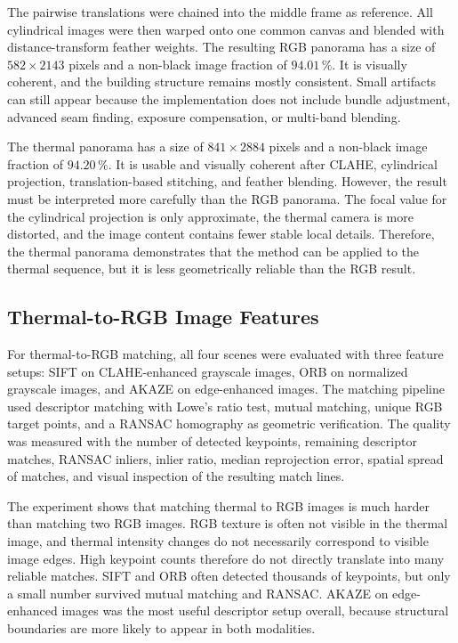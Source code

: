 The pairwise translations were chained into the middle frame as reference. All
cylindrical images were then warped onto one common canvas and blended with
distance-transform feather weights. The resulting RGB panorama has a size of
\(582 \times 2143\) pixels and a non-black image fraction of \(94.01\,\%\). It
is visually coherent, and the building structure remains mostly consistent.
Small artifacts can still appear because the implementation does not include
bundle adjustment, advanced seam finding, exposure compensation, or multi-band
blending.

The thermal panorama has a size of \(841 \times 2884\) pixels and a non-black
image fraction of \(94.20\,\%\). It is usable and visually coherent after CLAHE,
cylindrical projection, translation-based stitching, and feather blending.
However, the result must be interpreted more carefully than the RGB panorama.
The focal value for the cylindrical projection is only approximate, the thermal
camera is more distorted, and the image content contains fewer stable local
details. Therefore, the thermal panorama demonstrates that the method can be
applied to the thermal sequence, but it is less geometrically reliable than the
RGB result.

\subsection{Thermal-to-RGB Image Features}

For thermal-to-RGB matching, all four scenes were evaluated with three feature
setups: SIFT on CLAHE-enhanced grayscale images, ORB on normalized grayscale
images, and AKAZE on edge-enhanced images. The matching pipeline used
descriptor matching with Lowe's ratio test, mutual matching, unique RGB target
points, and a RANSAC homography as geometric verification. The quality was
measured with the number of detected keypoints, remaining descriptor matches,
RANSAC inliers, inlier ratio, median reprojection error, spatial spread of
matches, and visual inspection of the resulting match lines.

The experiment shows that matching thermal to RGB images is much harder than
matching two RGB images. RGB texture is often not visible in the thermal image,
and thermal intensity changes do not necessarily correspond to visible image
edges. High keypoint counts therefore do not directly translate into many
reliable matches. SIFT and ORB often detected thousands of keypoints, but only a
small number survived mutual matching and RANSAC. AKAZE on edge-enhanced images
was the most useful descriptor setup overall, because structural boundaries are
more likely to appear in both modalities.

